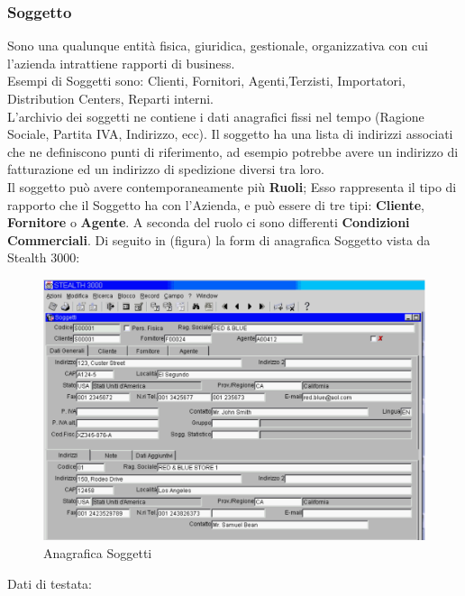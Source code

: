 \subsubsection{Soggetto}
Sono una qualunque entità fisica, giuridica, gestionale, organizzativa con cui l'azienda intrattiene rapporti di business.\\
Esempi di Soggetti sono: Clienti, Fornitori, Agenti,Terzisti, Importatori, Distribution Centers, Reparti interni.\\
L'archivio dei soggetti ne contiene i dati anagrafici fissi nel tempo (Ragione Sociale, Partita IVA, Indirizzo, ecc). Il soggetto ha una lista di indirizzi associati che ne definiscono punti di riferimento, ad esempio potrebbe avere un indirizzo di fatturazione ed un indirizzo di spedizione diversi tra loro.\\
Il soggetto può avere contemporaneamente più \textbf{Ruoli}; Esso rappresenta il tipo di rapporto che il Soggetto ha con l'Azienda, e può essere di tre tipi: \textbf{Cliente}, \textbf{Fornitore} o \textbf{Agente}. A seconda del ruolo ci sono differenti \textbf{Condizioni Commerciali}.
Di seguito in (figura) la form di anagrafica Soggetto vista da Stealth 3000:
\newpage
\begin{figure}[!h]
\thispagestyle{empty}
\centering
\includegraphics[scale=0.45]{img/SogAnag.png}
\caption{Anagrafica Soggetti}
\end{figure}
\newpage
Dati di testata:
